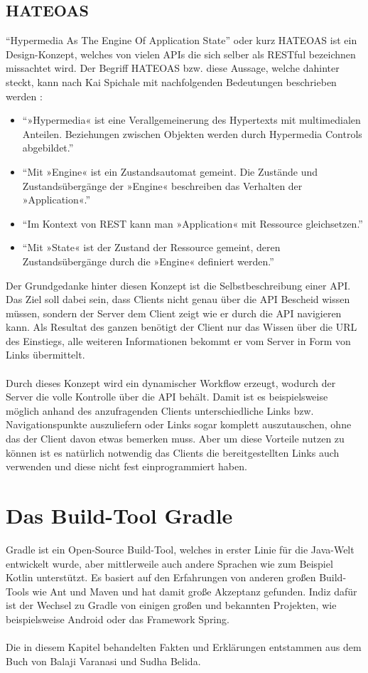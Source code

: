 \subsection{HATEOAS}
\enquote{Hypermedia As The Engine Of Application State} oder kurz HATEOAS ist ein Design-Konzept, welches von vielen \glspl{API} die sich selber als \gls{REST}ful bezeichnen missachtet wird. \cite{restMustBeHypertextDriven} Der Begriff HATEOAS bzw. diese Aussage, welche dahinter steckt, kann nach Kai Spichale mit nachfolgenden Bedeutungen beschrieben werden \cite[156]{apiDesign}:
\begin{itemize}
	\item \enquote{»Hypermedia« ist eine Verallgemeinerung des Hypertexts mit multimedialen Anteilen. Beziehungen zwischen Objekten werden durch
		Hypermedia Controls abgebildet.}
	\item \enquote{Mit »Engine« ist ein Zustandsautomat gemeint. Die Zustände und
		Zustandsübergänge der »Engine« beschreiben das Verhalten der
		»Application«.}
	\item \enquote{Im Kontext von REST kann man »Application« mit Ressource
		gleichsetzen.}
	\item \enquote{Mit »State« ist der Zustand der Ressource gemeint, deren Zustandsübergänge durch die »Engine« definiert werden.}
\end{itemize}
Der Grundgedanke hinter diesen Konzept ist die Selbstbeschreibung einer \gls{API}. Das Ziel soll dabei sein, dass Clients nicht genau über die \gls{API} Bescheid wissen müssen, sondern der Server dem Client zeigt wie er durch die \gls{API} navigieren kann. Als Resultat des ganzen benötigt der Client nur das Wissen über die \gls{URL} des Einstiegs, alle weiteren Informationen bekommt er vom Server in Form von Links übermittelt.\\
\\
Durch dieses Konzept wird ein dynamischer Workflow erzeugt, wodurch der Server die volle Kontrolle über die \gls{API} behält. Damit ist es beispielsweise möglich anhand des anzufragenden Clients unterschiedliche Links bzw. Navigationspunkte auszuliefern oder Links sogar komplett auszutauschen, ohne das der Client davon etwas bemerken muss. Aber um diese Vorteile nutzen zu können ist es natürlich notwendig das Clients die bereitgestellten Links auch verwenden und diese nicht fest einprogrammiert haben.

\section{Das Build-Tool Gradle}
Gradle ist ein Open-Source Build-Tool, welches in erster Linie für die Java-Welt entwickelt wurde, aber mittlerweile auch andere Sprachen wie zum Beispiel Kotlin unterstützt. Es basiert auf den Erfahrungen von anderen großen Build-Tools wie Ant und Maven und hat damit große Akzeptanz gefunden. Indiz dafür ist der Wechsel zu Gradle von einigen großen und bekannten Projekten, wie beispielsweise Android oder das Framework Spring.\\
\\
Die in diesem Kapitel behandelten Fakten und Erklärungen entstammen aus dem Buch \cite{introducingGradle} von Balaji Varanasi und Sudha Belida.

